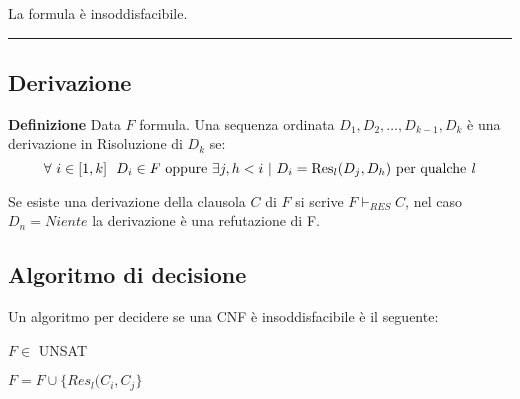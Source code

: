 \documentclass{article}
\begin{document}
\vspace{-15pt}

\noindent La formula è insoddisfacibile.

\noindent\rule{\textwidth}{0.5pt}\newline

\vspace{-15pt}

\subsection{Derivazione}

\textbf{Definizione} Data $F$ formula. Una sequenza ordinata $D_1,D_2,\ldots,D_{k-1},D_k$ è una derivazione in Risoluzione di $D_k$ se:
$$\forall \ i\in[1,k]\ \ D_i\in F \text{ oppure } \exists j,h< i\ |\
D_i=\text{Res}_l(D_j,D_h) \text{ per qualche \textit{l}}$$

 \noindent Se esiste una derivazione della clausola $C$ di $F$ si scrive $F\vdash_{RES}C$, nel caso $D_n=\textit{Niente}$ la derivazione è una refutazione di F.

\subsection{Algoritmo di decisione}

Un algoritmo per decidere se una CNF è insoddisfacibile è il seguente:

\begin{algorithm}
\caption{$F\in $ UNSAT}
\begin{algorithmic}
\State $F=F\cup\{Res_l(C_i,C_j\}$
\EndWhile
\end{algorithmic}
\end{algorithm}
\end{document}
